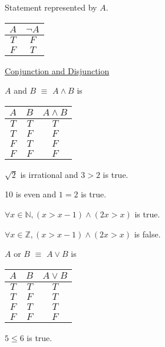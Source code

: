 \documentclass{article}
\begin{document}
Statement represented by $A$. 


\begin{table}[!h]
    \centering
    \begin{tabular}{|c|c|} \hline 
        $A$ & $\neg A$\\ \hline 
        $T$ & $F$\\ \hline 
        $F$ & $T$\\ \hline
    \end{tabular}
\end{table}

\underline{Conjunction and Disjunction}

$A$ and $B$ $\equiv$ $A \wedge B$ is 

\begin{table}[!h]
    \centering
    \begin{tabular}{|c|c|c|} \hline 
        $A$ & $B$ & $A \wedge B$\\ \hline 
        $T$ & $T$ & $T$\\ \hline 
        $T$ & $F$ & $F$\\ \hline 
        $F$ & $T$ & $F$\\ \hline 
        $F$ & $F$ & $F$\\ \hline
    \end{tabular}
\end{table}

$\sqrt{2}$ is irrational and $3 > 2$ is true.

10 is even and $1=2$ is true.

$\forall x \in \mathbb{N}, (x > x - 1) \wedge (2x > x)$ is true.

$\forall x \in \mathbb{Z}, (x > x-1) \wedge (2x >x)$ is false.

$A$ or $B$ $\equiv$ $A \vee B$ is 

\begin{table}[!h]
    \centering
    \begin{tabular}{|c|c|c|} \hline 
        $A$ & $B$ & $A \vee B$\\ \hline 
        $T$ & $T$ & $T$\\ \hline 
        $T$ & $F$ & $T$\\ \hline 
        $F$ & $T$ & $T$\\ \hline 
        $F$ & $F$ & $F$\\ \hline
    \end{tabular}
\end{table}

$5 \le 6$ is true.
\end{document}
